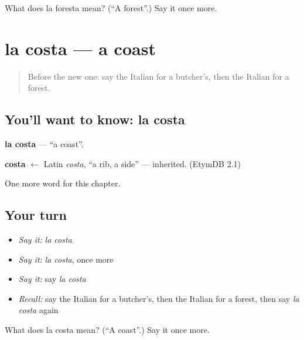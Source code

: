 \begin{tcolorbox}[breakable,colback=teal!4,colframe=teal!35!black,title={Before you move on}]
What does la foresta mean? (\textquotedblleft{}A forest\textquotedblright{}.) Say it once more.
\end{tcolorbox}
\section[la costa]{la costa — a coast}

\label{lesson:IT-C221-costa}



\begin{quote}
Before the new one: say the Italian for a butcher's, then the Italian for a forest.
\end{quote}

\subsection*{You'll want to know: la costa}
\textbf{la costa} — \textquotedblleft{}a coast\textquotedblright{}.

\begin{cousinweb}
\textbf{costa} $\leftarrow$ Latin \emph{costa}, \textquotedblleft{}a rib, a side\textquotedblright{} — inherited. (EtymDB 2.1)
\end{cousinweb}

\begin{grammarlens}[title={What you've built}]
One more word for this chapter.
\end{grammarlens}

\subsection*{Your turn}
\begin{itemize}
\raggedright
  \item \emph{Say it:} \emph{la costa}
  \item \emph{Say it:} \emph{la costa}, once more
  \item \emph{Say it:} say \emph{la costa}
  \item \emph{Recall:} say the Italian for a butcher's, then the Italian for a forest, then say \emph{la costa} again
\end{itemize}

\begin{tcolorbox}[breakable,colback=teal!4,colframe=teal!35!black,title={Before you move on}]
What does la costa mean? (\textquotedblleft{}A coast\textquotedblright{}.) Say it once more.
\end{tcolorbox}
